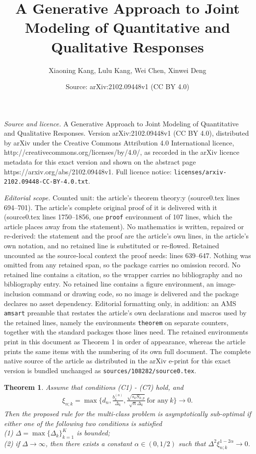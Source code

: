 \documentclass[10pt,a4paper]{amsart}
\title{A Generative Approach to Joint Modeling of Quantitative and Qualitative Responses}
\author{Xiaoning Kang, Lulu Kang, Wei Chen, Xinwei Deng}
\date{Source: arXiv:2102.09448v1 (CC BY 4.0)}
\newtheorem{theorem}{Theorem}
\begin{document}
\maketitle

\noindent\emph{Source and licence.} A Generative Approach to Joint Modeling of Quantitative and Qualitative Responses. Version arXiv:2102.09448v1 (CC BY 4.0), distributed by arXiv under the Creative Commons Attribution 4.0 International licence, http://creativecommons.org/licenses/by/4.0/, as recorded in the arXiv licence metadata for this exact version and shown on the abstract page https://arxiv.org/abs/2102.09448v1. Full licence notice: \texttt{licenses/arxiv-2102.09448-CC-BY-4.0.txt}.\par\smallskip

\noindent\textit{Editorial scope.} Counted unit: the article's theorem theory:y (source0.tex lines 694--701). The article's complete original proof of it is delivered with it (source0.tex lines 1750--1856, one \texttt{proof} environment of 107 lines, which the article places away from the statement). No mathematics is written, repaired or re-derived: the statement and the proof are the article's own lines, in the article's own notation, and no retained line is substituted or re-flowed.  Retained uncounted as the source-local context the proof needs: lines 639--647.  Nothing was omitted from any retained span, so the package carries no omission record.  No retained line contains a citation, so the wrapper carries no bibliography and no bibliography entry.  No retained line contains a figure environment, an image-inclusion command or drawing code, so no image is delivered and the package declares no asset dependency.  Editorial formatting only, in addition: an AMS \texttt{amsart} preamble that restates the article's own declarations and macros used by the retained lines, namely the environments \texttt{theorem} on separate counters, together with the standard packages those lines need.  The retained environments print in this document as Theorem 1 in order of appearance, whereas the article prints the same items with the numbering of its own full document.  The complete native source of the article as distributed in the arXiv e-print for this exact version is bundled unchanged as \texttt{sources/108282/source0.tex}.
\begin{theorem}{}{\label{theory:multiclass}}
Assume that conditions (C1) - (C7) hold, and
\begin{align*}
\xi_{n;k} = \max \{ d_n, \frac{b_k^{(n)}}{\Delta_k}, \frac{\sqrt{s_k S_{h;p}}}{\sqrt{n} \Delta_k} ~\mbox{for any}~k \} \rightarrow 0.
\end{align*}
Then the proposed rule for the multi-class problem is asymptotically sub-optimal if either one of the following two conditions is satisfied  \\
(1) $\Delta = \max \{ \Delta_k \}_{k=1}^K$ is bounded; \\
(2) if $\Delta \rightarrow \infty$, then there exists a constant $\alpha \in (0, 1/2)$  such that $\Delta^2 \xi_{n;k}^{1-2 \alpha} \rightarrow 0$.
\end{theorem}
\end{document}
